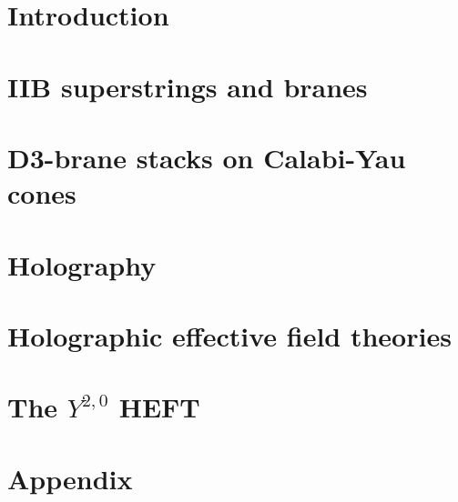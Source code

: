 \documentclass[11pt,a4paper,twoside,openright,titlepage]{book}
\author{Riccardo Antonelli}
\begin{document}
\frontmatter




\setlength{\parskip}{0.2cm} 

\tableofcontents

\mainmatter

\chapter{Introduction}



\chapter{IIB superstrings and branes}



\chapter{D3-brane stacks on Calabi-Yau cones}



\chapter{Holography}



\chapter{Holographic effective field theories}



\chapter{The $Y^{2,0}$ HEFT}

%



\appendix

\chapter{Appendix}




\backmatter



\end{document}
